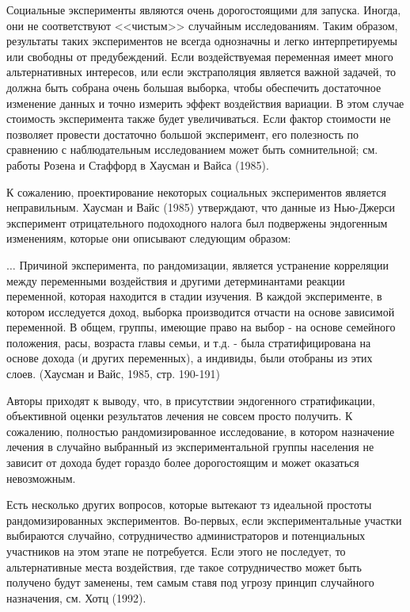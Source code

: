 Социальные эксперименты являются очень дорогостоящими для запуска. Иногда, они не соответствуют <<чистым>> случайным  исследованиям. Таким образом, результаты таких экспериментов не всегда однозначны и легко интерпретируемы или свободны от предубеждений. Если воздействуемая переменная имеет много альтернативных интересов, или если экстраполяция является важной задачей, то должна быть собрана очень большая выборка, чтобы обеспечить достаточное изменение данных и точно измерить эффект воздействия вариации. В этом случае стоимость эксперимента также будет увеличиваться. Если фактор стоимости не позволяет провести достаточно большой эксперимент, его полезность по сравнению с наблюдательным исследованием может быть сомнительной; см. работы Розена и Стаффорд в Хаусман и Вайса (1985).


К сожалению, проектирование некоторых социальных экспериментов является неправильным. Хаусман и Вайс (1985) утверждают, что данные из Нью-Джерси эксперимент отрицательного подоходного налога был подвержены эндогенным изменениям, которые они описывают следующим образом:

$\dots$ Причиной эксперимента, по рандомизации, является устранение корреляции между переменными воздействия и другими детерминантами реакции переменной, которая находится в стадии изучения. В каждой эксперименте, в котором исследуется доход, выборка производится отчасти на основе зависимой переменной. В общем, группы, имеющие право на выбор - на основе семейного положения, расы, возраста главы семьи, и т.д. - была стратифицирована на основе дохода (и других переменных), а индивиды, были отобраны из этих слоев. (Хаусман и Вайс, 1985, стр. 190-191)


Авторы приходят к выводу, что, в присутствии эндогенного стратификации, объективной оценки результатов лечения не совсем просто получить. К сожалению, полностью рандомизированное исследование, в котором назначение лечения в случайно выбранный из экспериментальной группы населения не зависит от дохода будет гораздо более дорогостоящим и может оказаться невозможным.


Есть несколько других вопросов, которые вытекают тз идеальной простоты рандомизированных экспериментов. Во-первых, если экспериментальные участки выбираются случайно, сотрудничество администраторов и потенциальных участников на этом этапе не потребуется. Если этого не последует, то альтернативные места воздействия, где такое сотрудничество может быть получено будут заменены, тем самым ставя под угрозу принцип случайного назначения, см. Хотц (1992).


